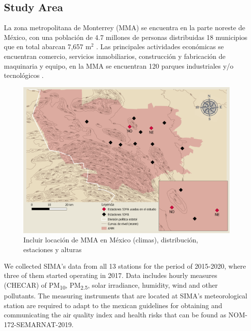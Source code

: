 \subsection{Study Area}
La zona metropolitana de Monterrey (MMA) se encuentra en la parte noreste de México, con una población de 4.7 millones de personas distribuidas 18 municipios que en total abarcan 7,657 m$^2$ \cite{SEDESOL2018}. Las principales actividades económicas se encuentran comercio, servicios inmobiliarios, construcción y fabricación de maquinaria y equipo, en la MMA se encuentran 120 parques industriales y/o tecnológicos \cite{economia2015}.
\begin{figure}[H]
    \centering
    \includegraphics[scale=0.15]{images/map.png}
    \caption{Incluir locación de MMA en México (climas), distribución, estaciones y alturas}
    \label{fig:map}
\end{figure}
We collected SIMA’s data from all 13 stations for the period of 2015-2020, where three of them started operating in 2017. Data includes hourly measures (CHECAR) of PM\textsubscript{10}, PM\textsubscript{2.5}, solar irradiance, humidity, wind and other pollutants. The measuring instruments that are located at SIMA’s meteorological station are required to adapt to the mexican guidelines for obtaining and communicating the air quality index and health risks that can be found as NOM-172-SEMARNAT-2019.

